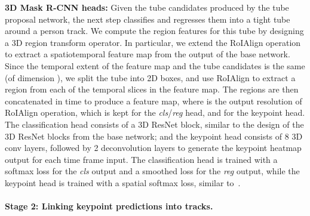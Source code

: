 \documentclass[10pt,twocolumn,letterpaper]{article}
\newcommand{\MODEL}[0]{3D Mask R-CNN}
\begin{document}
{\noindent \bf \MODEL{} heads:}
Given the tube candidates produced by the tube proposal network, the next step classifies and regresses them into a tight tube around a person track.
We compute the region features for this tube by designing a 3D region transform operator. In particular, we extend the RoIAlign
operation~\cite{he2017mask} to extract a spatiotemporal feature map from the output of the base network.
Since the temporal extent of the feature map and the tube candidates is the same (of dimension ), we split the tube
into  2D boxes, and use RoIAlign to extract a region from each of the  temporal slices in the feature map. The regions are then
concatenated in time to produce a  feature map, where  is the output resolution of RoIAlign
operation, which is kept  for the {\em cls}/{\em reg} head, and  for the keypoint head.
The classification head consists of a 3D ResNet block, similar to the design of the 3D ResNet blocks from the base network; and the 
keypoint head consists of 8 3D conv layers, followed by 2 deconvolution layers to generate the keypoint heatmap
output for each time frame input. The classification head is trained with a softmax loss for the {\em cls} output and a smoothed  loss for the {\em reg} output, while the 
keypoint head is trained with a spatial softmax loss, similar to~\cite{he2017mask}.


\paragraph{Stage 2: Linking keypoint predictions into tracks.}\label{sec:approach:stage2}
\end{document}
